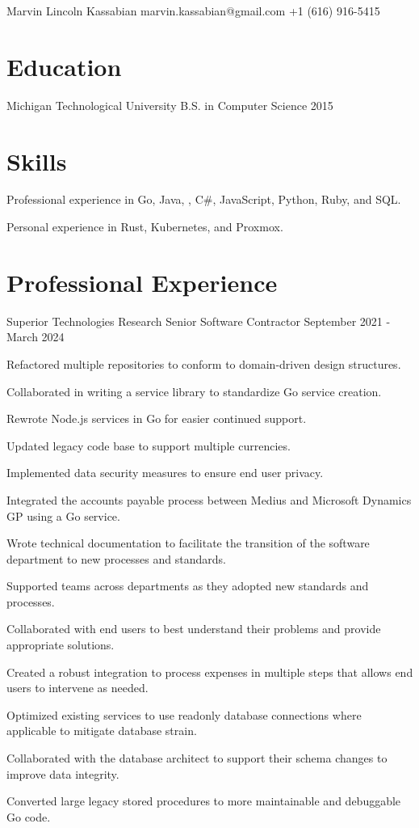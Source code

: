 \documentclass{marvinkassabian_resume}
\begin{document}
\resumeheadersimple
{Marvin Lincoln Kassabian}
{marvin.kassabian@gmail.com}
{+1 (616) 916-5415}

\section{Education}
\subsectionlocationdate
{Michigan Technological University}
{B.S. in Computer Science}
{2015}

\section{Skills}
\resumesublistbegin
\item Professional experience in Go, Java, \cpp, C\#, JavaScript, Python, Ruby, and SQL.
\item Personal experience in Rust, Kubernetes, and Proxmox.
\resumesublistend

\section{Professional Experience}

\subsectionpositiondate
{Superior Technologies Research}
{Senior Software Contractor}
{September 2021 - March 2024}
\resumesublistbegin
\item Refactored multiple repositories to conform to domain-driven design structures.
\item Collaborated in writing a service library to standardize Go service creation.
\item Rewrote Node.js services in Go for easier continued support.
\item Updated legacy code base to support multiple currencies.
\item Implemented data security measures to ensure end user privacy.
\item Integrated the accounts payable process between Medius and Microsoft Dynamics GP using a Go service.
\item Wrote technical documentation to facilitate the transition of the software department to new processes and standards.
\item Supported teams across departments as they adopted new standards and processes.
\item Collaborated with end users to best understand their problems and provide appropriate solutions.
\item Created a robust integration to process expenses in multiple steps that allows end users to intervene as needed.
\item Optimized existing services to use readonly database connections where applicable to mitigate database strain.
\item Collaborated with the database architect to support their schema changes to improve data integrity.
\item Converted large legacy stored procedures to more maintainable and debuggable Go code.
\resumesublistend
\end{document}
